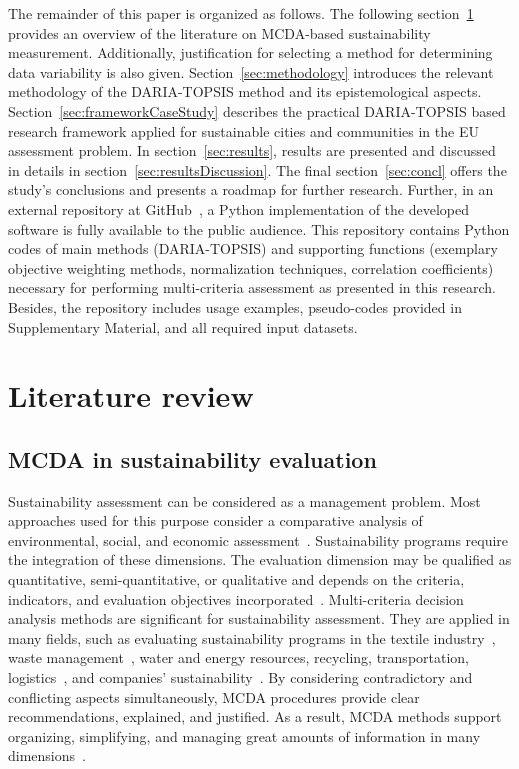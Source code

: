 \documentclass[final,5p,times,twocolumn,authoryear]{elsarticle}
\newcounter{example}[section]
\begin{document}
The remainder of this paper is organized as follows. The following section~\ref{sec:litrev} provides an overview of the literature on MCDA-based sustainability measurement. Additionally, justification for selecting a method for determining data variability is also given. Section~\ref{sec:methodology} introduces the relevant methodology of the DARIA-TOPSIS method and its epistemological aspects. Section~\ref{sec:frameworkCaseStudy} describes the practical DARIA-TOPSIS based research framework applied for sustainable cities and communities in the EU assessment problem. In section~\ref{sec:results}, results are presented and discussed in details in section~\ref{sec:resultsDiscussion}. The final section~\ref{sec:concl} offers the study’s conclusions and presents a roadmap for further research. Further, in an external repository at GitHub~\citep{dariagithub2022}, a Python implementation of the developed software is fully available to the public audience. This repository contains Python codes of main methods (DARIA-TOPSIS) and supporting functions (exemplary objective weighting methods, normalization techniques, correlation coefficients) necessary for performing multi-criteria assessment as presented in this research. Besides, the repository includes usage examples, pseudo-codes provided in Supplementary Material, and all required input datasets.

\section{Literature review}
\label{sec:litrev}

\subsection{MCDA in sustainability evaluation}
Sustainability assessment can be considered as a management problem. Most approaches used for this purpose consider a comparative analysis of environmental, social, and economic assessment~\citep{rafiaani2018social}. Sustainability programs require the integration of these dimensions. The evaluation dimension may be qualified as quantitative, semi-quantitative, or qualitative and depends on the criteria, indicators, and evaluation objectives incorporated~\citep{deshpande2020multi}. Multi-criteria decision analysis methods are significant for sustainability assessment. They are applied in many fields, such as evaluating sustainability programs in the textile industry~\citep{lombardi2021multiple}, waste management~\citep{deshpande2020multi}, water and energy resources, recycling, transportation, logistics~\citep{colapinto2020environmental}, and companies' sustainability~\citep{myllyviita2017sustainability}. By considering contradictory and conflicting aspects simultaneously, MCDA procedures provide clear recommendations, explained, and justified. As a result, MCDA methods support organizing, simplifying, and managing great amounts of information in many dimensions~\citep{morfoulaki2021use}.
\end{document}
